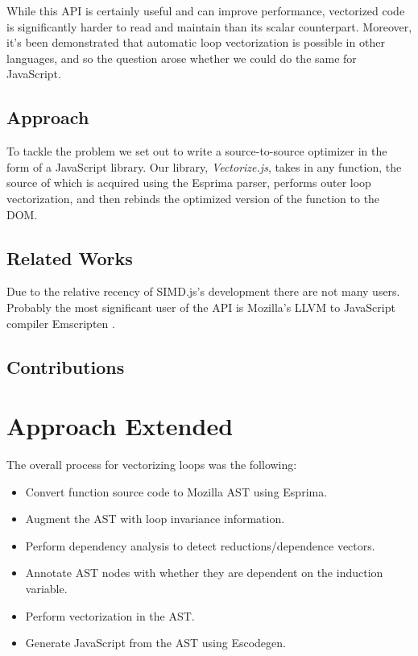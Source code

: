 \documentclass[conference]{IEEEtran}
\begin{document}
  While this API is certainly useful and can improve performance, vectorized
  code is significantly harder to read and maintain than its scalar counterpart.
  Moreover, it's been demonstrated that automatic loop vectorization is possible
  in other languages, and so the question arose whether we could do the same
  for JavaScript.

\subsection{Approach}

  To tackle the problem we set out to write a source-to-source optimizer in the
  form of a JavaScript library. Our library, \textit{Vectorize.js}, takes in
  any function, the source of which is acquired using the Esprima parser,
  performs outer loop vectorization, and then rebinds the optimized version of
  the function to the DOM.

\subsection{Related Works}

  Due to the relative recency of SIMD.js's development there are not many
  users. Probably the most significant user of the API is Mozilla's LLVM to
  JavaScript compiler Emscripten \cite{emscripten}.

\subsection{Contributions}

\section{Approach Extended}

The overall process for vectorizing loops was the following:
\begin{itemize}
\item Convert function source code to Mozilla AST using Esprima.
\item Augment the AST with loop invariance information.
\item Perform dependency analysis to detect reductions/dependence vectors.
\item Annotate AST nodes with whether they are dependent on the induction variable.
\item Perform vectorization in the AST.
\item Generate JavaScript from the AST using Escodegen.
\end{itemize}
\end{document}
